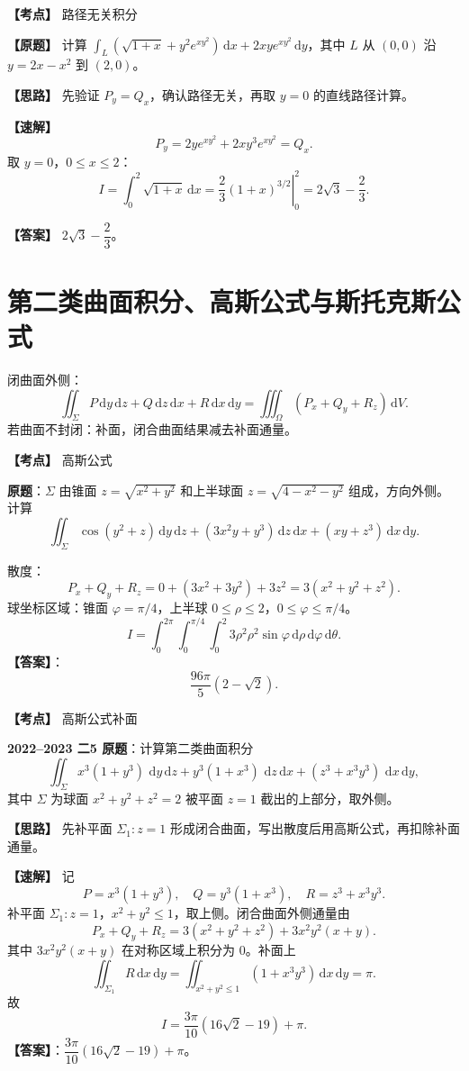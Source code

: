 ﻿\documentclass[11pt,a4paper,UTF8]{ctexart}
\newcommand{\dd}{\,\mathrm d}
\begin{document}
\begin{answerbox}[2022--2023 二-4]
\textbf{【考点】} 路径无关积分

\textbf{【原题】} 计算 $\displaystyle \int_L\left(\sqrt{1+x}+y^2e^{xy^2}\right)\dd x+2xye^{xy^2}\dd y$，其中 $L$ 从 $(0,0)$ 沿 $y=2x-x^2$ 到 $(2,0)$。

\textbf{【思路】} 先验证 $P_y=Q_x$，确认路径无关，再取 $y=0$ 的直线路径计算。

\textbf{【速解】}
\[
P_y=2ye^{xy^2}+2xy^3e^{xy^2}=Q_x.
\]
取 $y=0$，$0\le x\le2$：
\[
I=\int_0^2\sqrt{1+x}\dd x
=\left.\frac23(1+x)^{3/2}\right|_0^2
=2\sqrt3-\frac23.
\]

\textbf{【答案】} $2\sqrt3-\dfrac23$。
\end{answerbox}
\section{第二类曲面积分、高斯公式与斯托克斯公式}

\begin{templatebox}[高斯公式模板]
闭曲面外侧：
\[
\iint_\Sigma P\dd y\dd z+Q\dd z\dd x+R\dd x\dd y
=\iiint_\Omega(P_x+Q_y+R_z)\dd V.
\]
若曲面不封闭：补面，闭合曲面结果减去补面通量。
\end{templatebox}

\begin{answerbox}[2020--2021 三-11]
\textbf{【考点】} 高斯公式

\textbf{原题}：$\Sigma$ 由锥面 $z=\sqrt{x^2+y^2}$ 和上半球面 $z=\sqrt{4-x^2-y^2}$ 组成，方向外侧。计算
\[
\iint_\Sigma \cos(y^2+z)\dd y\dd z+(3x^2y+y^3)\dd z\dd x+(xy+z^3)\dd x\dd y.
\]

散度：
\[
P_x+Q_y+R_z=0+(3x^2+3y^2)+3z^2=3(x^2+y^2+z^2).
\]
球坐标区域：锥面 $\varphi=\pi/4$，上半球 $0\le\rho\le2$，$0\le\varphi\le\pi/4$。
\[
I=\int_0^{2\pi}\int_0^{\pi/4}\int_0^2 3\rho^2\rho^2\sin\varphi\dd\rho\dd\varphi\dd\theta.
\]
\textbf{【答案】}：
\[
\frac{96\pi}{5}(2-\sqrt2).
\]
\end{answerbox}

\begin{answerbox}[2022--2023 二-5]
\textbf{【考点】} 高斯公式补面

\textbf{2022--2023 二5 原题}：计算第二类曲面积分
\[
\iint_\Sigma x^3(1+y^3)\,\dd y\dd z
+y^3(1+x^3)\,\dd z\dd x
+(z^3+x^3y^3)\,\dd x\dd y,
\]
其中 $\Sigma$ 为球面 $x^2+y^2+z^2=2$ 被平面 $z=1$ 截出的上部分，取外侧。

\textbf{【思路】} 先补平面 $\Sigma_1:z=1$ 形成闭合曲面，写出散度后用高斯公式，再扣除补面通量。

\textbf{【速解】} 记
\[
P=x^3(1+y^3),\quad Q=y^3(1+x^3),\quad R=z^3+x^3y^3.
\]
补平面 $\Sigma_1:z=1$，$x^2+y^2\le1$，取上侧。闭合曲面外侧通量由
\[
P_x+Q_y+R_z=3(x^2+y^2+z^2)+3x^2y^2(x+y).
\]
其中 $3x^2y^2(x+y)$ 在对称区域上积分为 $0$。补面上
\[
\iint_{\Sigma_1}R\dd x\dd y
=\iint_{x^2+y^2\le1}(1+x^3y^3)\dd x\dd y=\pi.
\]
故
\[
I=\frac{3\pi}{10}(16\sqrt2-19)+\pi.
\]
\textbf{【答案】}：$\dfrac{3\pi}{10}(16\sqrt2-19)+\pi$。

\end{answerbox}
\end{document}
